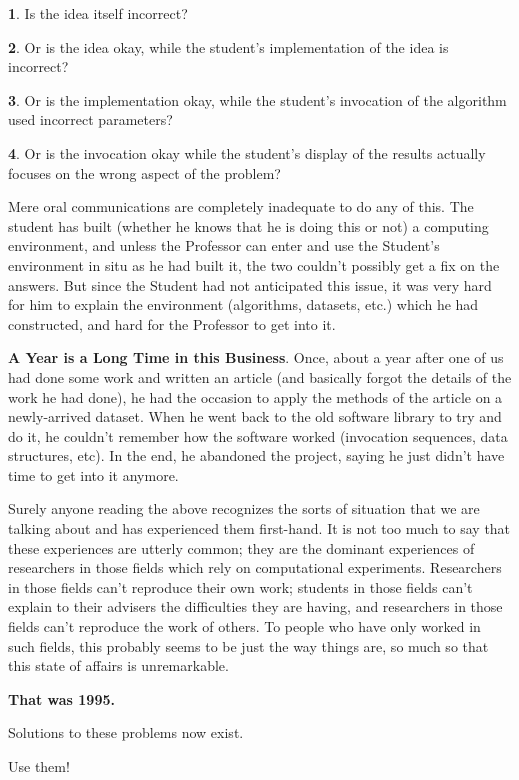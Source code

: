\documentclass[portrait,11pt]{seminar}
\begin{document}
{\bf 1}. Is the idea itself incorrect?

{\bf 2}. Or is the idea okay, while the student's implementation of the idea is incorrect?

{\bf 3}. Or is the implementation okay, while the student's invocation of the algorithm
used incorrect parameters?

{\bf 4}. Or is the invocation okay while the student's display of the results actually
focuses on the wrong aspect of the problem?

Mere oral communications are completely inadequate to do any of this. The student
has built (whether he knows that he is doing this or not) a computing environment,
and unless the Professor can enter and use the Student's environment in situ as he
had built it, the two couldn't possibly get a fix on the answers. But since the Student
had not anticipated this issue, it was very hard for him to explain the environment
(algorithms, datasets, etc.) which he had constructed, and hard for the Professor to
get into it.

\es

\bs
{\bf A Year is a Long Time in this Business}. Once, about a year after one of us had done
some work and written an article (and basically forgot the details of the work he had
done), he had the occasion to apply the methods of the article on a newly-arrived
dataset. When he went back to the old software library to try and do it, he couldn't
remember how the software worked (invocation sequences, data structures, etc). In
the end, he abandoned the project, saying he just didn't have time to get into it
anymore.
\es

\bs
Surely anyone reading the above recognizes the sorts of situation that we are talking
about and has experienced them first-hand. It is not too much to say that these experiences
are utterly common; they are the dominant experiences of researchers in those fields which
rely on computational experiments. Researchers in those fields can't reproduce their own
work; students in those fields can't explain to their advisers the difficulties they are having,
and researchers in those fields can't reproduce the work of others.
To people who have only worked in such fields, this probably seems to be just the way
things are, so much so that this state of affairs is unremarkable.

\es

\bs
{\bf That was 1995. 

Solutions to these problems now exist. 

Use them!}
\end{document}
